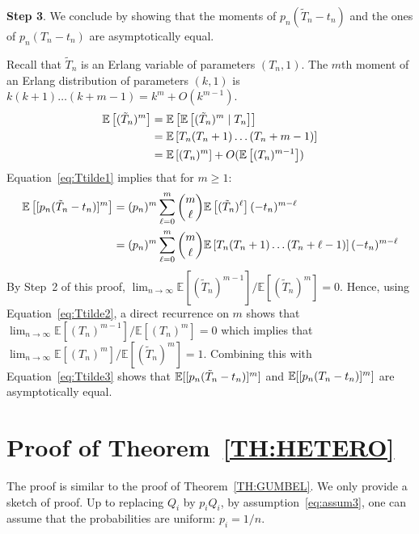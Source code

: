 \documentclass{aptpub}
\newcommand\expect[1]{\mathchoice{\bexpect{#1}}{\sexpect{#1}}{\sexpect{#1}}{\sexpect{#1}}}
\newcommand\bexpect[1]{\mathbb{E}\left[#1\right]}
\newcommand\sexpect[1]{\mathbb{E}[#1]}
\begin{document}
  \textbf{Step 3}. We conclude by showing that the moments of
  $p_n(\tilde T_n-t_n)$ and the ones of $p_n(T_n-t_n)$ are
  asymptotically equal.  

  Recall that $\tilde T_n$ is an Erlang variable of parameters
  $(T_n,1)$. The $m$th moment of an Erlang distribution of parameters
  $(k,1)$ is $k(k+1)\dots(k+m-1)=k^m + O(k^{m-1})$.
  \begin{align}
    \expect{(\tilde T_n)^m} & =\expect{\expect{(\tilde T_n)^{m}\mid
                              T_n}}\nonumber\\ 
                            &= \expect{T_n(T_n+1)\dots(T_n+m-1)}\label{eq:Ttilde1}\\
                            &= \expect{(T_n)^m} +
                              O(\expect{(T_n)^{m-1}})\label{eq:Ttilde2} 
  \end{align}
  Equation~\eqref{eq:Ttilde1} implies that for $m\ge1$:
  \begin{align}
    \expect{ [p_n(\tilde T_n-t_n)]^m} 
    &= (p_n)^m\sum_{\ell=0}^m \binom{m}{\ell} \expect{(\tilde
      T_n)^\ell}(-t_n)^{m-\ell}\nonumber\\
    &= (p_n)^m\sum_{\ell=0}^m \binom{m}{\ell}
      \expect{T_n(T_n+1)\dots(T_n+\ell-1)}(-t_n)^{m-\ell}
          \label{eq:Ttilde3}
  \end{align}
  By Step~2 of this proof,
  $\lim_{n\to\infty}\sexpect{(\tilde{T}_n)^{m-1}}/\sexpect{(\tilde{T}_n)^{m}}=0$. Hence,
  using Equation~\eqref{eq:Ttilde2}, a direct recurrence on $m$ shows
  that $\lim_{n\to\infty}\sexpect{(T_n)^{m-1}}/\sexpect{(T_n)^{m}}=0$
  which implies that
  $\lim_{n\to\infty}\sexpect{(T_n)^m}/\sexpect{(\tilde{T}_n)^m}=1$. Combining
  this with Equation~\eqref{eq:Ttilde3} shows that
  $ \expect{ [p_n(\tilde T_n-t_n)]^m} $ and
  $\expect{ [p_n( T_n-t_n)]^m}$ are asymptotically equal.
  


\section{Proof of Theorem~\ref{TH:HETERO}}
\label{apx:proof_hetero}

The proof is similar to the proof of Theorem~\ref{TH:GUMBEL}. We
only provide a sketch of proof.  Up to replacing $Q_i$ by $p_iQ_i$, by
assumption~\eqref{eq:assum3}, one can assume that the probabilities
are uniform: $p_i=1/n$.
\end{document}
